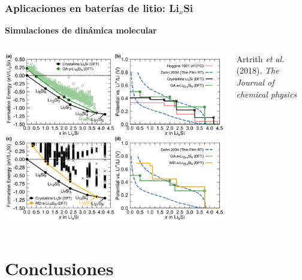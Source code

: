\documentclass[aspectratio=169]{beamer}
\let\oldtextbf\textbf
\renewcommand{\textbf}[1]{\textcolor{nordblue}{\oldtextbf{#1}}}
\begin{document}
    \begin{frame}
        \frametitle{Aplicaciones en baterías de litio: Li$_x$Si}
        
        \textbf{Simulaciones de dinámica molecular}

        \begin{columns}
            \begin{center}
                \includegraphics[width=\columnwidth]{LiSi-potencial_vs_Li.png}
            \end{center}
            
            \tiny{Artrith \textit{et al.} (2018). \textit{The Journal of chemical
            physics}}
        \end{columns}
            
    \end{frame}
    
    \section{Conclusiones}
\end{document}
